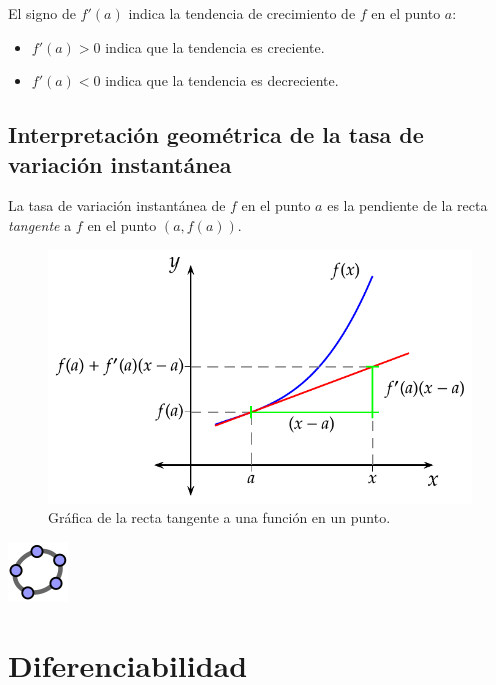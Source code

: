\documentclass[
  a4paper,
]{scrreport}
\providecommand{\tightlist}{%
  \setlength{\itemsep}{0pt}\setlength{\parskip}{0pt}}\usepackage{longtable,booktabs,array}
\theoremstyle{definition}
\theoremstyle{plain}
\theoremstyle{definition}
\theoremstyle{definition}
\theoremstyle{plain}
\theoremstyle{plain}
\theoremstyle{remark}
\begin{document}
El signo de \(f'(a)\) indica la tendencia de crecimiento de \(f\) en el
punto \(a\):

\begin{itemize}
\tightlist
\item
  \(f'(a)>0\) indica que la tendencia es creciente.
\item
  \(f'(a)<0\) indica que la tendencia es decreciente.
\end{itemize}

\subsection{Interpretación geométrica de la tasa de variación
instantánea}\label{interpretaciuxf3n-geomuxe9trica-de-la-tasa-de-variaciuxf3n-instantuxe1nea}

La tasa de variación instantánea de \(f\) en el punto \(a\) es la
pendiente de la recta \emph{tangente} a \(f\) en el punto \((a,f(a))\).

\begin{figure}[H]

{\centering \includegraphics{img/derivadas/tangente.png}

}

\caption{Gráfica de la recta tangente a una función en un punto.}

\end{figure}%

\href{https://www.geogebra.org/m/TX3ABH6F}{\includegraphics{img/logos/logo-geogebra.png}}

\section{Diferenciabilidad}\label{diferenciabilidad}
\end{document}
